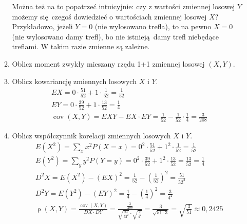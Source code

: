 \documentclass[twoside]{mwart}
\newcommand{\ans}[1]{}
\newenvironment{ansenv}{\comment}{\endcomment}
\newenvironment{ansenv}{\paragraph{Odpowiedź:}}{}
\newcommand{\ans}[1]{\begin{ansenv}#1\end{ansenv}}
\DeclareMathOperator{\cov}{cov}
\DeclareMathOperator{\corr}{\rho}
\begin{document}
\begin{enumerate}
\begin{enumerate}
\begin{ansenv}
	Można też na to popatrzeć intuicyjnie: czy z wartości zmiennej losowej $Y$ możemy się czegoś dowiedzieć o wartościach zmiennej losowej $X$?
	Przykładowo, jeżeli $Y=0$ (nie wylosowano trefla), to na pewno $X=0$ (nie wylosowano damy trefl), bo nie istnieją damy trefl niebędące treflami.
	W takim razie zmienne są zależne.
\end{ansenv}
\item Oblicz moment zwykły mieszany rzędu 1+1 zmiennej losowej $(X,Y)$. \ans{\[EXY=E(X\cdot Y)=\sum_{x}\sum_{y} x\cdot y\cdot P(X=x, Y=y) = 
	0\cdot 0\cdot \frac{39}{52} + 0\cdot 1\cdot \frac{12}{52} + 1\cdot 1\cdot \frac{1}{52} = \frac{1}{52}
	\]}
\item Oblicz kowariancję zmiennych losowych $X$ i $Y$.
\begin{ansenv}
	\begin{gather*}
	 EX = 0\cdot\frac{51}{52} + 1\cdot\frac{1}{52} = \frac{1}{52}  \\
	 EY = 0\cdot\frac{39}{52} + 1\cdot\frac{13}{52} = \frac{1}{4}  \\
	 \cov(X,Y) = EXY-EX\cdot EY = \frac{1}{52} - \frac{1}{52}\cdot \frac{1}{4} = \frac{3}{208} 
	\end{gather*}
\end{ansenv}
\item Oblicz współczynnik korelacji zmiennych losowych $X$ i $Y$.
\begin{ansenv}
	\begin{gather*}
	E(X^2) = \sum_x x^2P(X=x) = 0^2\cdot\frac{51}{52} + 1^2\cdot\frac{1}{52} = \frac{1}{52} \\
	E(Y^2) = \sum_y y^2P(Y=y) = 0^2\cdot\frac{39}{52} + 1^2\cdot\frac{13}{52} = \frac{13}{52} = \frac{1}{4} \\
	D^2X = E(X^2)-(EX)^2 = \frac{1}{52} - \left(\frac{1}{52}\right)^2 = \frac{51}{52^2} \\
	D^2Y = E(Y^2)-(EY)^2 = \frac{1}{4} - \left(\frac{1}{4}\right)^2 = \frac{3}{4^2} \\
	\corr(X,Y) = \frac{\cov(X,Y)}{DX\cdot DY} = \frac{\frac{3}{208}}{\sqrt{\frac{51}{52^2}}\cdot\sqrt{\frac{3}{4^2}}} = \frac{3}{\sqrt{51\cdot 3}} = \sqrt{\frac{3}{51}} \approx 0{,}2425
	\end{gather*}
\end{ansenv}
\end{enumerate}


\end{enumerate}
\end{document}
